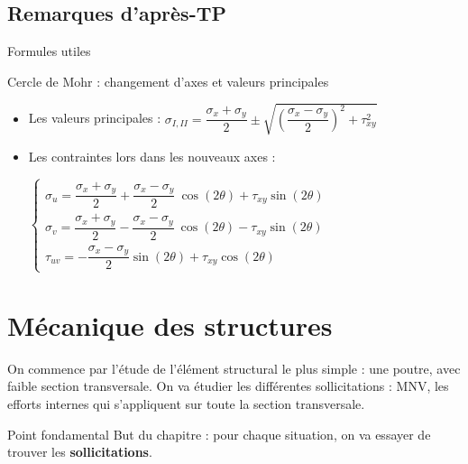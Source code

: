 \documentclass[10pt]{beamer}
\begin{document}
\subsection{Remarques d'après-TP}
\begin{frame}{Formules utiles}
\begin{block}{Cercle de Mohr : changement d'axes et valeurs principales}
\begin{itemize}
\item Les valeurs principales : $\sigma_{I, II} = \dfrac{\sigma_x + \sigma_y}{2} \pm \sqrt{\left( \dfrac{\sigma_x - \sigma_y}{2}\right)^2 + \tau_{xy} ^2}$
\item Les contraintes lors dans les nouveaux axes :
\begin{center}
$\left\{ \begin{array}{l}

\sigma_u = \dfrac{\sigma_x + \sigma_y}{2} + \dfrac{\sigma_x - \sigma_y}{2} \ \cos(2\theta) + \tau_{xy} \sin(2\theta) \\

\sigma_v = \dfrac{\sigma_x + \sigma_y}{2} - \dfrac{\sigma_x - \sigma_y}{2} \ \cos(2\theta) - \tau_{xy} \sin(2\theta) \\

\tau_{uv} = -\dfrac{\sigma_x - \sigma_y}{2} \sin(2\theta) + \tau_{xy} \cos(2\theta)

\end{array} \right.$
\end{center}
\end{itemize}
\end{block}
\end{frame}
\section{Mécanique des structures}
\begin{frame}
\tableofcontents[currentsection]
\end{frame}
\begin{frame}
On commence par l'étude de l'élément structural le plus simple : une poutre, avec faible section transversale. On va étudier les différentes sollicitations : MNV, les efforts internes qui s'appliquent sur toute la section transversale.
\begin{alertblock}{Point fondamental}
But du chapitre : pour chaque situation, on va essayer de trouver les \textbf{sollicitations}.
\begin{center}
\end{center}
\end{alertblock}
\end{frame}
\end{document}
